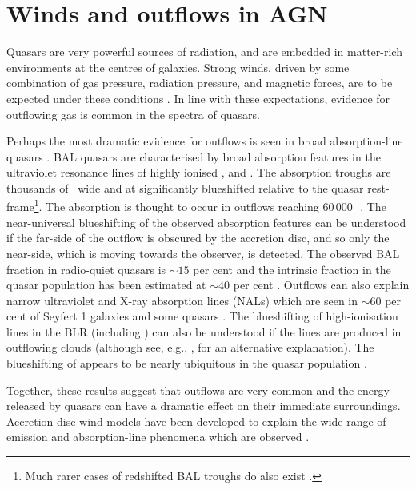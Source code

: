 \section{Winds and outflows in AGN}
\label{sec:ch1-winds}

Quasars are very powerful sources of radiation, and are embedded in matter-rich environments at the centres of galaxies.
Strong winds, driven by some combination of gas pressure, radiation pressure, and magnetic forces, are to be expected under these conditions \citep[e.g.][]{blandford82b,proga00,everett05}. 
In line with these expectations, evidence for outflowing gas is common in the spectra of quasars. 

Perhaps the most dramatic evidence for outflows is seen in broad absorption-line quasars \citep[BAL quasars;][]{weymann91}.
BAL quasars are characterised by broad absorption features in the ultraviolet resonance lines of highly ionised ,  and . 
The absorption troughs are thousands of \kms\, wide and at significantly blueshifted relative to the quasar rest-frame\footnote{Much rarer cases of redshifted BAL troughs do also exist \citep[e.g.][]{hall13}.}. 
The absorption is thought to occur in outflows reaching $60\,000$\,\kms\, \citep[e.g.][]{turnshek88}. 
The near-universal blueshifting of the observed absorption features can be understood if the far-side of the outflow is obscured by the accretion disc, and so only the near-side, which is moving towards the observer, is detected. 
The observed  BAL fraction in radio-quiet quasars is $\sim15$ per cent \citep[e.g.][]{hewett03,reichard03} and the intrinsic fraction in the quasar population has been estimated at $\sim40$ per cent \citep{allen11}.
Outflows can also explain narrow ultraviolet and X-ray absorption lines (NALs) which are seen in $\sim60$ per cent of Seyfert 1 galaxies \citep{crenshaw99} and some quasars \citep[e.g.][]{hamann97}. 
The blueshifting of high-ionisation lines in the BLR (including ) can also be understood if the lines are produced in outflowing clouds (although see, e.g., \citealt{gaskell16}, for an alternative explanation). 
The blueshifting of  appears to be nearly ubiquitous in the quasar population \citep[e.g.][]{richards02,richards11}. 

Together, these results suggest that outflows are very common and the energy released by quasars can have a dramatic effect on their immediate surroundings. 
Accretion-disc wind models have been developed to explain the wide range of emission and absorption-line phenomena which are observed \citep[e.g.][]{murray95,elvis00,proga00,everett05}.
  
